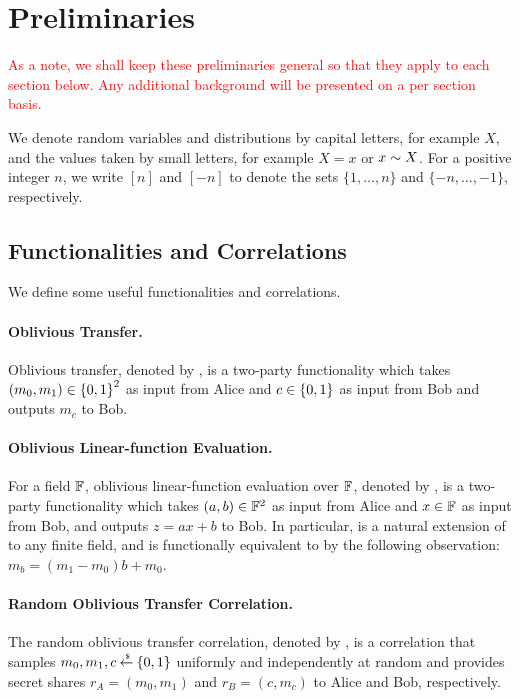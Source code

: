\section{Preliminaries}\label{sec:prelims}
\textcolor{red}{As a note, we shall keep these preliminaries general so that they apply to each section below. Any additional background will be presented on a per section basis.}

We denote random variables and distributions by capital letters, for example $X$, and the values taken by small letters, for example $X = x$ or $x \sim X$.
For a positive integer $n$, we write $[n]$ and $[-n]$ to denote the sets $\{ 1,\dotsc, n \}$ and $\{ -n,\dotsc, -1 \}$, respectively.

\subsection{Functionalities and Correlations}\label{sec:prelim-func-corr}
We define some useful functionalities and correlations.

\paragraph{Oblivious Transfer.}
Oblivious transfer, denoted by \OT, is a two-party functionality which takes $(m_0,m_1) \in {\{0,1\}}^2$ as input from Alice and $c \in {\{0,1\}}$ as input from Bob and outputs $m_c$ to Bob.

\paragraph{Oblivious Linear-function Evaluation.}
For a field ${\mathbb F}$, oblivious linear-function evaluation over ${\mathbb F}$, denoted by \OLE[\bbF], is a two-party functionality which takes $(a,b) \in {\mathbb F}^2$ as input from Alice and $x \in {\mathbb F}$ as input from Bob, and outputs $z = ax+b$ to Bob.
In particular, \OLE[\bbF] is a natural extension of \OT to any finite field, and \OLE[\GF{2}] is functionally equivalent to \OT by the following observation: $m_b = (m_1 - m_0)b + m_0$.

\paragraph{Random Oblivious Transfer Correlation.}
The random oblivious transfer correlation, denoted by \ROT, is a correlation that samples $m_0,m_1,c \mathbin{\stackrel{\mbox{\,\tiny \$}}{\gets}} {\{0,1\}}$ uniformly and independently at random and provides secret shares $r_A = (m_0,m_1)$ and $r_B = (c,m_c)$ to Alice and Bob, respectively.

